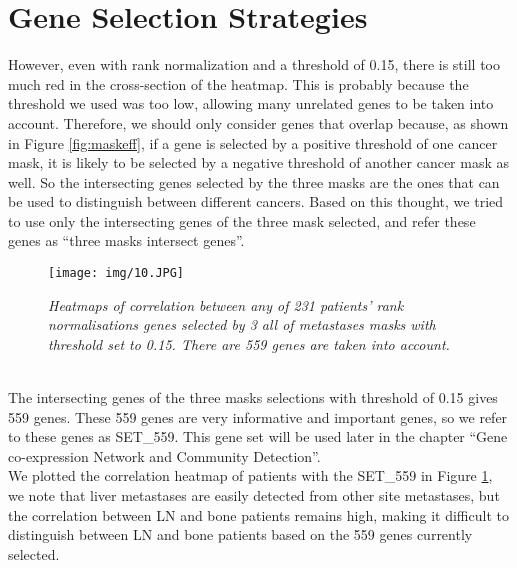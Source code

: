 \documentclass[12pt,a4paper]{report}
\begin{document}
\section{Gene Selection Strategies}
However, even with rank normalization and a threshold of 0.15, there is still too much red in the cross-section of the heatmap. This is probably because the threshold we used was too low, allowing many unrelated genes to be taken into account. Therefore, we should only consider genes that overlap because, as shown in Figure \ref{fig:maskeff}, if a gene is selected by a positive threshold of one cancer mask, it is likely to be selected by a negative threshold of another cancer mask as well. So the intersecting genes selected by the three masks are the ones that can be used to distinguish between different cancers. Based on this thought, we tried to use only the intersecting genes of the three mask selected, and refer these genes as “three masks intersect genes”.\\


\begin{figure}[h!]
\centering
\texttt{[image: img/10.JPG]}
\caption{\textit{Heatmaps of correlation between any of 231 patients’ rank normalisations genes selected by 3 all of metastases masks with threshold set to 0.15. There are 559 genes are taken into account.}}
\label{fig:559hm}
\end{figure}\\

The intersecting genes of the three masks selections with threshold of 0.15 gives 559 genes. These 559 genes are very informative and important genes, so we refer to these genes as SET\_559. This gene set will be used later in the chapter “Gene co-expression Network and Community Detection”. \\

We plotted the correlation heatmap of patients with the SET\_559 in Figure \ref{fig:559hm}, we note that liver metastases are easily detected from other site metastases, but the correlation between LN and bone patients remains high, making it difficult to distinguish between LN and bone patients based on the 559 genes currently selected.\\
\end{document}
